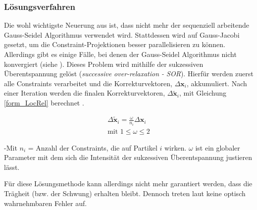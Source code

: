 
\subsubsection{Lösungsverfahren}
Die wohl wichtigste Neuerung aus \cite{UPP} ist, dass nicht mehr der sequenziell arbeitende Gauss-Seidel Algorithmus verwendet wird. Stattdessen wird auf Gauss-Jacobi gesetzt, um die Constraint-Projektionen besser parallelisieren zu können. Allerdings gibt es einige Fälle, bei denen der Gauss-Seidel Algorithmus nicht konvergiert (siehe \cite{UPP}).
Dieses Problem wird mithilfe der sukzessiven Überentspannung gelöst (\textit{successive over-relaxation - SOR}). Hierfür werden zuerst alle Constraints verarbeitet und die Korrekturvektoren, $\Delta \textbf{x}_i$, akkumuliert. Nach einer Iteration werden die finalen Korrekturvektoren, $\Delta \widetilde{\textbf{x}}_i$, mit Gleichung \ref{form_LocRel} berechnet \cite{UPP}.

\begin{equation}
\begin{split}
\Delta \widetilde{\textbf{x}}_i = \frac{\omega}{n_i} \Delta \textbf{x}_i \\
\text{mit }  1 \leq \omega \leq 2
\end{split}
\label{form_LocRel}
\end{equation}

-Mit $n_i$ = Anzahl der Constraints, die auf Partikel $i$ wirken. $\omega$ ist ein globaler Parameter mit dem sich die Intensität der sukzessiven Überentspannung justieren lässt.

Für diese Lösungsmethode kann allerdings nicht mehr garantiert werden, dass die Trägheit (bzw. der Schwung) erhalten bleibt. Dennoch treten laut \cite{UPP} keine optisch wahrnehmbaren Fehler auf. 


